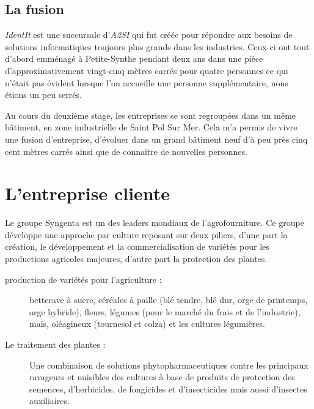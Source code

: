 
\subsection{La fusion} %
\label{sub:La fusion}

\emph{IdentIt} est une succursale d'\emph{A2SI} qui fut créée pour
répondre aux besoins de solutions informatiques toujours plus grands
dans les industries. Ceux-ci ont tout d'abord emménagé à Petite-Synthe
pendant deux ans dans une pièce d'approximativement vingt-cinq mètres
carrés pour quatre personnes ce qui n'était pas évident lorsque l'on
accueille une personne supplémentaire, nous étions un peu serrés.

Au cours du deuxième stage, les entreprises se sont regroupées dans
un même bâtiment, en zone industrielle de Saint Pol Sur Mer. Cela m'a
permis de vivre une \og fusion \fg{} d'entreprise, d'évoluer dans un
grand bâtiment neuf d'à peu près cinq cent mètres carrés ainsi que de
connaitre de nouvelles personnes.



\section{L'entreprise cliente} %
\label{sec:L'entreprise cliente}

Le groupe Syngenta est un des leaders mondiaux de l’agrofourniture.  Ce
groupe développe une approche par culture reposant sur deux piliers,
d'une part la création, le développement et la commercialisation de
variétés pour les productions agricoles majeures, d'autre part la
protection des plantes.

\begin{description}

  \item[production de variétés pour l'agriculture :] betterave à sucre,
    céréales à paille (blé tendre, blé dur, orge de printemps, orge
    hybride), fleurs, légumes (pour le marché du frais et de
    l’industrie), maïs, oléagineux (tournesol et colza) et les cultures
    légumières.

  \item[Le traitement des plantes :] Une combinaison de solutions
    phytopharmaceutiques contre les principaux ravageurs et nuisibles
    des cultures à base de produits de protection des semences,
    d’herbicides, de fongicides et d’insecticides mais aussi d’insectes
    auxiliaires.

\end{description}



